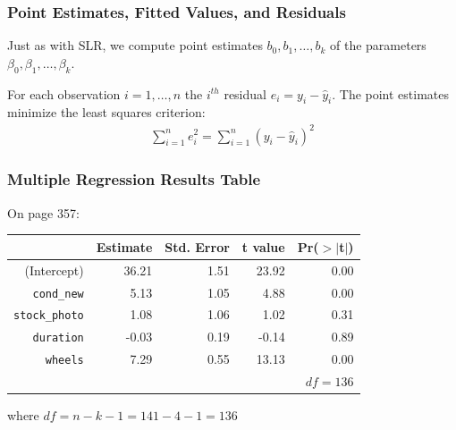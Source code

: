 \documentclass[handout]{beamer}
\newcommand{\blue}[1]{\textcolor{blue2}{#1}}
\begin{document}
\begin{frame}[fragile]
\frametitle{Point Estimates, Fitted Values, and Residuals}
%
%
Just as with SLR, we compute \blue{point estimates} $b_0, b_1, \ldots, b_k$ of the \blue{parameters} $\beta_0, \beta_1, \ldots, \beta_k$.

\pause\vspace{0.5cm}

For each observation $i=1,\ldots,n$ the $i^{th}$ \blue{residual} $e_i=y_i - \widehat{y}_i$.  The point estimates minimize the \blue{least squares criterion}:
\begin{eqnarray*}
\sum_{i=1}^{n} e_i^2 = \sum_{i=1}^{n} (y_i - \widehat{y}_i)^2
\end{eqnarray*}
\end{frame}


\begin{frame}[fragile]
\frametitle{Multiple Regression Results Table}

On page 357:
\begin{table}[ht]
\centering
\begin{tabular}{r|rrrr}
  \hline
 & Estimate & Std. Error & t value & Pr($>$$|$t$|$) \\ 
  \hline
(Intercept) & 36.21 & 1.51 & 23.92 & 0.00 \\ 
{\tt cond\_new} & 5.13 & 1.05 & 4.88 & 0.00 \\ 
{\tt stock\_photo} & 1.08 & 1.06 & 1.02 & 0.31 \\ 
{\tt duration} & -0.03 & 0.19 & -0.14 & 0.89 \\ 
{\tt wheels} & 7.29 & 0.55 & 13.13 & 0.00 \\ 
   \hline
   & & & & $df=136$\\
\end{tabular}
\end{table}
where $df=n-k-1=141-4-1=136$
\end{frame}
\end{document}

